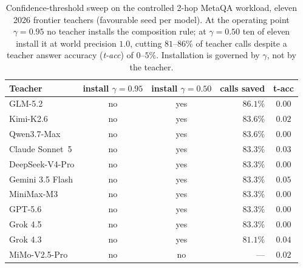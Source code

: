 \begin{table}[t]
\centering
\small
\caption{Confidence-threshold sweep on the controlled 2-hop MetaQA workload,
eleven 2026 frontier teachers (favourable seed per model). At the operating
point $\gamma{=}0.95$ no teacher installs the composition rule; at
$\gamma{=}0.50$ ten of eleven install it at world precision $1.0$, cutting
$81$--$86\%$ of teacher calls despite a teacher answer accuracy (\emph{t-acc}) of
$0$--$5\%$. Installation is governed by $\gamma$, not by the teacher.}
\label{tab:threshold_gate}
\begin{tabular}{lccrc}
\toprule
Teacher & install $\gamma{=}0.95$ & install $\gamma{=}0.50$ & calls saved & t-acc \\
\midrule
GLM-5.2            & no & yes & $86.1\%$ & $0.00$ \\
Kimi-K2.6          & no & yes & $83.6\%$ & $0.02$ \\
Qwen3.7-Max        & no & yes & $83.6\%$ & $0.00$ \\
Claude Sonnet~5    & no & yes & $83.3\%$ & $0.03$ \\
DeepSeek-V4-Pro    & no & yes & $83.3\%$ & $0.00$ \\
Gemini 3.5 Flash   & no & yes & $83.3\%$ & $0.05$ \\
MiniMax-M3         & no & yes & $83.3\%$ & $0.00$ \\
GPT-5.6            & no & yes & $83.3\%$ & $0.00$ \\
Grok 4.5           & no & yes & $83.3\%$ & $0.00$ \\
Grok 4.3           & no & yes & $81.1\%$ & $0.04$ \\
MiMo-V2.5-Pro      & no & no  & ---      & $0.02$ \\
\bottomrule
\end{tabular}
\end{table}
